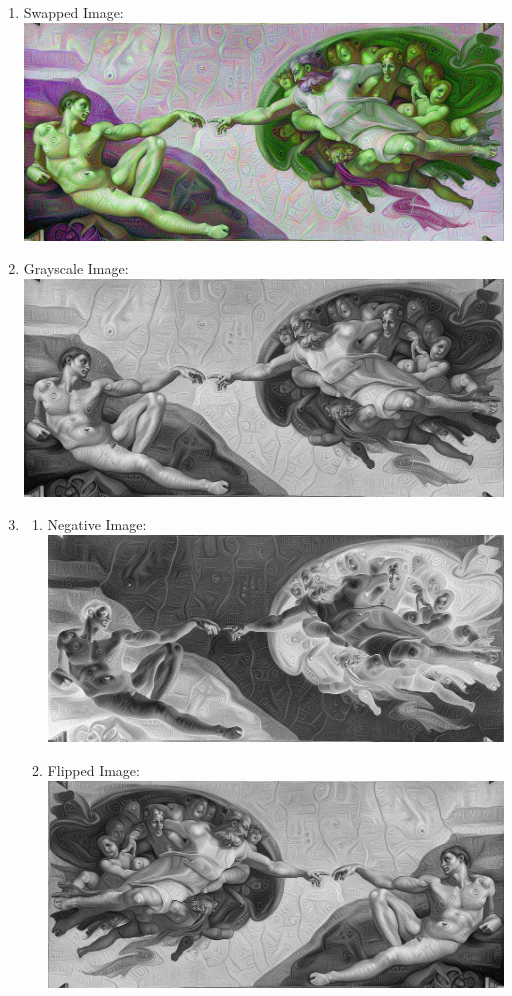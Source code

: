 \documentclass{article}
\begin{document}
	\begin{enumerate}
		\item Swapped Image: \\
		\includegraphics[width=\textwidth]{plots/2/swapImgPS0Q2.png}
		\item Grayscale Image: \\ 
		\includegraphics[width=\textwidth]{plots/2/grayImgPS0Q2.png}
		\item
			\begin{enumerate}	
				\item Negative Image: \\
				\includegraphics[width=\textwidth]{plots/2/negativeImgPS0Q2.png}
				\pagebreak
				\item Flipped Image: \\ 
				\includegraphics[width=\textwidth]{plots/2/mirrorImgPS0Q2.png}

\end{enumerate}
\end{enumerate}
\end{document}
